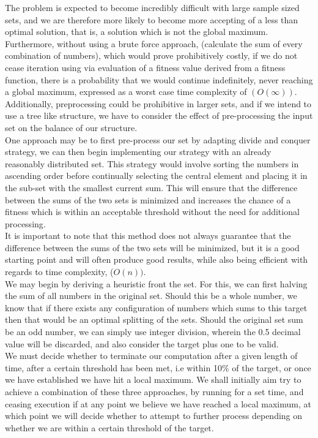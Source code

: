 \documentclass[a4paper]{article}
\begin{document}
The problem is expected to become
incredibly difficult with large sample sized sets, and we are therefore more likely to become more accepting of
a less than optimal solution, that is, a solution which is not the global maximum. 
Furthermore, without using a brute force approach,
(calculate the sum of every combination of numbers), which would prove prohibitively costly,
if we do not cease iteration using via evaluation of a fitness value  derived from a fitness function,
there is a probability that
we would continue indefinitely, 
never reaching a global maximum, expressed as a worst case time complexity of $(O(\infty)).$ \\

Additionally, preprocessing could be prohibitive in larger sets, and if we intend to use a tree
like structure, we have to consider the effect of pre-processing the input set on the balance of our structure. \\

One approach may be to first pre-process our set by adapting divide and conquer strategy, we can then
begin implementing our 
strategy with an already reasonably distributed set. This strategy would involve sorting the numbers in ascending order before
continually selecting the central element and placing it in the sub-set with the smallest current sum.
This will ensure that the difference between the sums of the two sets is minimized and increases the chance of 
a fitness which is within an acceptable threshold without the need for additional processing. \\

It is important to note that this method does not always guarantee that the difference between the sums of the two sets will be minimized, 
but it is a good starting point and will often produce good results, while also being efficient with regards to time complexity, ($O(n)).$ \\

We may begin by deriving a heuristic front the set. For this, we can first 
halving the sum of all numbers in the original set.
Should this be a whole number, we know that if there exists any configuration of numbers which 
sums to this target then that would be an optimal splitting of the sets.
Should the original set sum be an odd number, we can simply use integer division, 
wherein the 0.5 decimal value will be discarded, and also consider the target plus one to be valid.\\

We must decide whether to terminate our computation after a given length of time, 
after a certain threshold has been met, i.e within 10\% of the target,
or once we have established we have hit a local maximum.
We shall initially aim try to achieve a combination of these three approaches, by running for a set time, 
and ceasing execution if at any point we believe we have reached a local maximum, at which point
we will decide whether to attempt to further process depending on whether we are within a certain threshold of the target.\\
\end{document}
